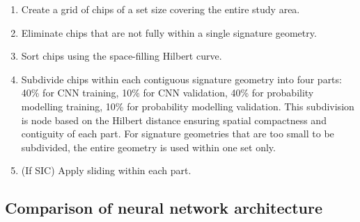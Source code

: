 \begin{enumerate}
    \item Create a grid of chips of a set size covering the entire study area.
    \item Eliminate chips that are not fully within a single signature geometry.
    \item Sort chips using the space-filling Hilbert curve.
    \item Subdivide chips within each contiguous signature geometry into four parts:
    40\% for CNN training, 10\% for CNN validation, 40\% for probability modelling
    training, 10\% for probability modelling validation. This subdivision is node based
    on the Hilbert distance ensuring spatial compactness and contiguity of each part.
    For signature geometries that are too small to be subdivided, the entire geometry is
    used within one set only.
    \item (If SIC) Apply sliding within each part.
\end{enumerate}


\subsection{Comparison of neural network architecture}
\label{sec:appendixA}

